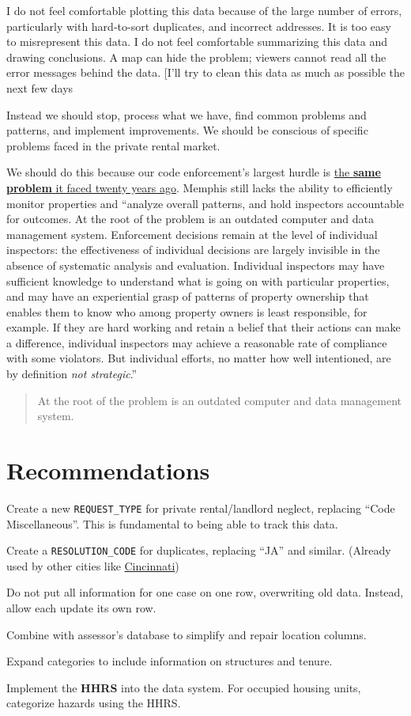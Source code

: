 \documentclass[
]{book}
\begin{document}
I do not feel comfortable plotting this data because of the large number of errors, particularly with hard-to-sort duplicates, and incorrect addresses. It is too easy to misrepresent this data. I do not feel comfortable summarizing this data and drawing conclusions. A map can hide the problem; viewers cannot read all the error messages behind the data. {[}I'll try to clean this data as much as possible the next few days

Instead we should stop, process what we have, find common problems and patterns, and implement improvements. We should be conscious of specific problems faced in the private rental market.

We should do this because our code enforcement's largest hurdle is \underline{the \textbf{same problem} it faced twenty years ago}. Memphis still lacks the ability to efficiently monitor properties and ``analyze overall patterns, and hold inspectors accountable for outcomes. At the root of the problem is an outdated computer and data management system. Enforcement decisions remain at the level of individual inspectors: the effectiveness of individual decisions are largely invisible in the absence of systematic analysis and evaluation. Individual inspectors may have sufficient knowledge to understand what is going on with particular properties, and may have an experiential grasp of patterns of property ownership that enables them to know who among property owners is least responsible, for example. If they are hard working and retain a belief that their actions can make a difference, individual inspectors may achieve a reasonable rate of compliance with some violators. But individual efforts, no matter how well intentioned, are by definition \emph{not strategic}.'' \citep[44]{betts2001}

\begin{quote}
At the root of the problem is an outdated computer and data management system.
\end{quote}

\hypertarget{recommendations-1}{%
\section{Recommendations}\label{recommendations-1}}

Create a new \texttt{REQUEST\_TYPE} for private rental/landlord neglect, replacing ``Code Miscellaneous''. This is fundamental to being able to track this data.

Create a \texttt{RESOLUTION\_CODE} for duplicates, replacing ``JA'' and similar. (Already used by other cities like \href{https://data.cincinnati-oh.gov/Thriving-Neighborhoods/Code-Enforcement/cncm-znd6}{Cincinnati})

Do not put all information for one case on one row, overwriting old data. Instead, allow each update its own row.

Combine with assessor's database to simplify and repair location columns.

Expand categories to include information on structures and tenure.

Implement the \textbf{HHRS} into the data system. For occupied housing units, categorize hazards using the HHRS.

  
\end{document}
